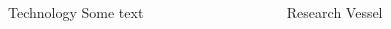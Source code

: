 \documentclass[final]{beamer}
\begin{document}
\begin{frame}{}
\begin{columns}[T]
\begin{column}{.32\linewidth}
   
\begin{block}{~Technology}
\justifying
Some text
\end{block}

\end{column}



\begin{column}{.32\linewidth}

\begin{block}{Research Vessel}
\justifying

\end{block}


\end{column}

\end{columns}

\vfill

\end{frame}
\end{document}
